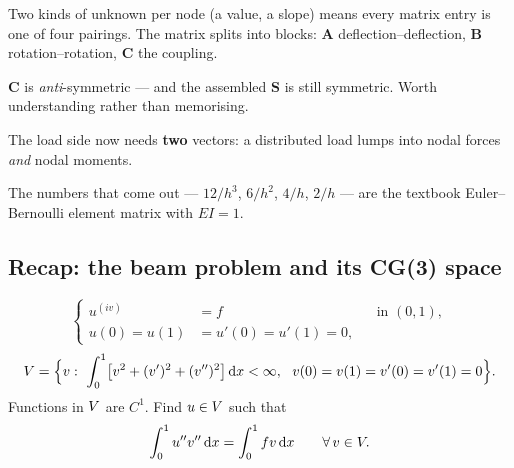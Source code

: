

\begin{roadmap}[Lecture 12]
\begin{roadlist}
\item Two kinds of unknown per node (a value, a slope) means every matrix entry
  is one of four pairings. The matrix splits into blocks: $\bm{A}$
  deflection--deflection, $\bm{B}$ rotation--rotation, $\bm{C}$ the coupling.
\item $\bm{C}$ is \emph{anti}-symmetric --- and the assembled $\bm{S}$ is still
  symmetric. Worth understanding rather than memorising.
\item The load side now needs \textbf{two} vectors: a distributed load lumps
  into nodal forces \emph{and} nodal moments.
\item The numbers that come out --- $12/h^{3}$, $6/h^{2}$, $4/h$, $2/h$ --- are
  the textbook Euler--Bernoulli element matrix with $EI=1$.
\end{roadlist}
\end{roadmap}

\subsection*{Recap: the beam problem and its CG(3) space}

\begin{equation}\label{eq:l12beam}
  \left\{
  \begin{aligned}
    u^{(iv)}&=f &&\text{in }(0,1),\\
    u(0)=u(1)&=u'(0)=u'(1)=0 ,
  \end{aligned}\right.
\end{equation}
\begin{equation}\label{eq:l12V}
  \Vsp=\Bigl\{v:\ \int_0^1\bigl[v^{2}+(v')^{2}+(v'')^{2}\bigr]\dx<\infty,\ \
  v(0)=v(1)=v'(0)=v'(1)=0\Bigr\}.
\end{equation}
Functions in $V$ are $C^{1}$. Find $u\in V$ such that
\begin{equation}\label{eq:l12weak}
  \int_0^1 u''v''\,\mathrm{d} x=\int_0^1 f v\,\mathrm{d} x\qquad\forall\,v\in V .
\end{equation}

